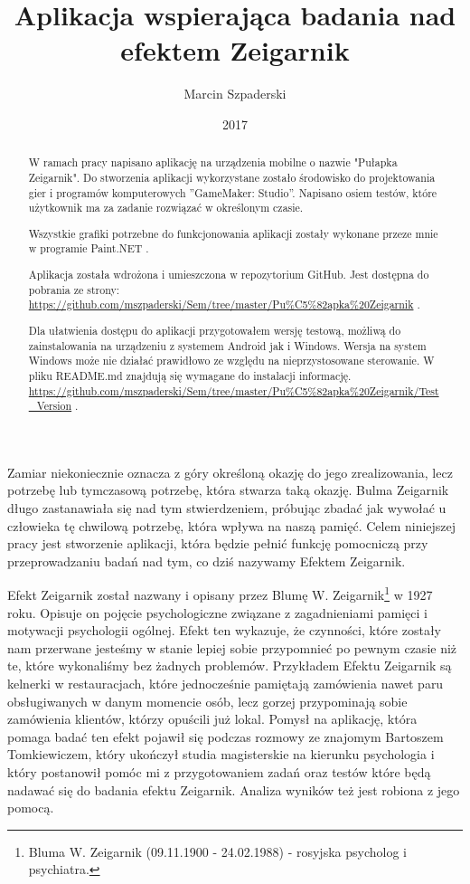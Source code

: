 \documentclass[openright]{xmgr}
\author   {Marcin Szpaderski}
\title    {Aplikacja wspierająca badania nad efektem Zeigarnik}
\date     {2017}
\begin{document}
\begin{abstract}
W ramach pracy napisano aplikację na urządzenia mobilne o nazwie "Pułapka Zeigarnik". Do stworzenia aplikacji wykorzystane zostało środowisko do projektowania gier i programów komputerowych ”GameMaker: Studio”. Napisano osiem testów, które użytkownik ma za zadanie rozwiązać w określonym czasie.

Wszystkie grafiki potrzebne do funkcjonowania aplikacji zostały wykonane przeze mnie w programie Paint.NET .

Aplikacja została wdrożona i umieszczona w repozytorium GitHub. Jest dostępna do pobrania ze strony: \url{ https://github.com/mszpaderski/Sem/tree/master/Pu\%C5\%82apka\%20Zeigarnik} .

Dla ułatwienia dostępu do aplikacji przygotowałem wersję testową, możliwą do zainstalowania na urządzeniu z systemem Android jak i Windows. Wersja na system Windows może nie działać prawidłowo ze względu na nieprzystosowane sterowanie. W pliku README.md znajdują się wymagane do instalacji informację. \url{ https://github.com/mszpaderski/Sem/tree/master/Pu\%C5\%82apka\%20Zeigarnik/Test_Version} .




\end{abstract}


\maketitle

\introduction

Zamiar niekoniecznie oznacza z góry określoną okazję do jego zrealizowania, lecz potrzebę lub tymczasową potrzebę, która stwarza taką okazję. Bulma Zeigarnik długo zastanawiała się nad tym stwierdzeniem, próbując zbadać jak wywołać u człowieka tę chwilową potrzebę, która wpływa na naszą pamięć. Celem niniejszej pracy jest stworzenie aplikacji, która będzie pełnić funkcję pomocniczą przy przeprowadzaniu badań nad tym, co dziś nazywamy Efektem Zeigarnik.

Efekt Zeigarnik został nazwany i opisany przez Blumę W. Zeigarnik\footnote{Bluma W. Zeigarnik (09.11.1900 - 24.02.1988) - rosyjska psycholog i psychiatra.} w 1927 roku. Opisuje on pojęcie psychologiczne związane z zagadnieniami pamięci i motywacji psychologii ogólnej. Efekt ten wykazuje, że czynności, które zostały nam przerwane jesteśmy w stanie lepiej sobie przypomnieć po pewnym czasie niż te, które wykonaliśmy bez żadnych problemów. Przykładem Efektu Zeigarnik są kelnerki w restauracjach, które jednocześnie pamiętają zamówienia nawet paru obsługiwanych w danym momencie osób, lecz gorzej przypominają sobie zamówienia klientów, którzy opuścili już lokal. Pomysł na aplikację, która pomaga badać ten efekt pojawił się podczas rozmowy ze znajomym Bartoszem Tomkiewiczem, który ukończył studia magisterskie na kierunku psychologia i który postanowił pomóc mi z przygotowaniem zadań oraz testów które będą nadawać się do badania efektu Zeigarnik. Analiza wyników też jest robiona z jego pomocą.
\end{document}
